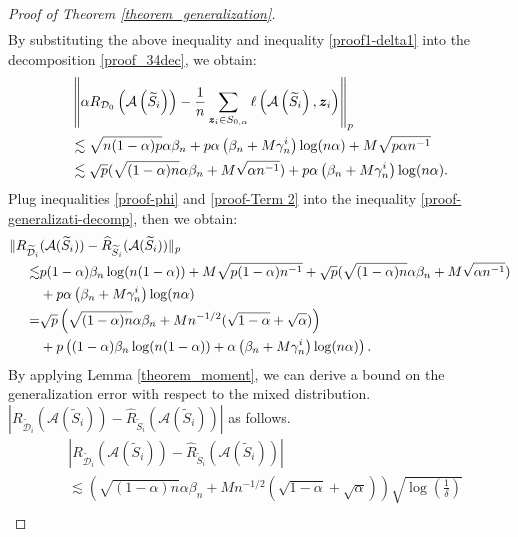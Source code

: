 \begin{proof}[Proof of Theorem \ref{theorem_generalization}]
$$\begin{aligned}
\end{aligned}
$$
By substituting the above inequality and inequality \ref{proof1-delta1} into the decomposition \ref{proof_34dec}, we obtain:
\begin{align}
    &\left\|\alpha R_{\mathcal{D}_0}\left(\mathcal{A}\left(\widetilde{S}_i\right)\right)-\frac{1}{n} \sum_{\boldsymbol{z}_i \in S_{0, \alpha}} \ell\left(\mathcal{A}\left(\widetilde{S}_i\right), \boldsymbol{z}_i\right)\right\|_p \notag \\
    &\lesssim \sqrt{n(1-\alpha) p} \alpha \beta_n+p  \alpha\left(\beta_n+M \gamma_n^i\right) \log (n \alpha)+M \sqrt{p  \alpha n^{-1}} \notag \\
    &\lesssim \sqrt{p}(\sqrt{(1-\alpha)n}\alpha\beta_n+M\sqrt{\alpha n^{-1}})+p  \alpha\left(\beta_n+M \gamma_n^i\right) \log (n \alpha)\label{proof-phi}.
\end{align}
Plug inequalities \ref{proof-phi} and \ref{proof-Term 2} into the inequality \ref{proof-generalizati-decomp}, then we obtain:
\begin{align}
\|R_{\widetilde{\mathcal{D}}_i}&(\mathcal{A}(\widetilde{S}_i))-\widehat{R}_{\widetilde{S}_i}(\mathcal{A}(\widetilde{S}_i))\|_p \notag \\
\lesssim &p(1-\alpha) \beta_n \log (n(1-\alpha))+M \sqrt{p(1-\alpha)n^{-1}}+\sqrt{p}(\sqrt{(1-\alpha)n}\alpha\beta_n+M\sqrt{\alpha n^{-1}})\notag \\
&+p  \alpha\left(\beta_n+M \gamma_n^i\right) \log (n \alpha)\notag \\
=& \sqrt{p}\left(\sqrt{(1-\alpha)n}\alpha\beta_n+Mn^{-1/2}(\sqrt{1-\alpha}+\sqrt{\alpha})\right)\notag \\
&+p\left((1-\alpha) \beta_n \log (n(1-\alpha))+\alpha\left(\beta_n+M \gamma_n^i\right) \log (n \alpha)\right).
\end{align}
By applying Lemma \ref{theorem_moment}, we can derive a bound on the generalization error with respect to the mixed distribution.$\left|R_{\widetilde{\mathcal{D}}_i}\left(\mathcal{A}\left(\widetilde{S}_i\right)\right)-\widehat{R}_{\widetilde{S}_i}\left(\mathcal{A}\left(\widetilde{S}_i\right)\right)\right|$ as follows.
$$
\begin{aligned}
& \left|R_{\widetilde{\mathcal{D}}_i}\left(\mathcal{A}\left(\widetilde{S}_i\right)\right)-\widehat{R}_{\widetilde{S}_i}\left(\mathcal{A}\left(\widetilde{S}_i\right)\right)\right| \\
& \lesssim \left(\sqrt{(1-\alpha) n} \alpha \beta_n+M n^{-1 / 2}(\sqrt{1-\alpha}+\sqrt{\alpha})\right) \sqrt{\log \left(\frac{1}{\delta}\right)} \\

\end{aligned}$$
\end{proof}
